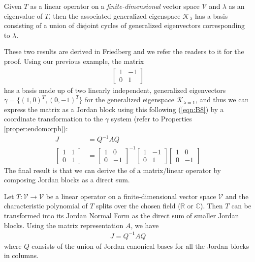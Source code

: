 \begin{thm}
\label{thm:B27}
Given $T$ as a linear operator on a \textit{finite-dimensional} vector space $\mathcal{V}$ and $\lambda$ as an eigenvalue of $T$, then the associated generalized eigenspace $\mathcal{K}_\lambda$ has a basis consisting of a union of disjoint cycles of generalized eigenvectors corresponding to $\lambda$.
\end{thm}
These two results are derived in Friedberg and we refer the readers to it for the proof. Using our previous example, the matrix
\begin{align*}
\begin{bmatrix}
1 & -1 \\
0 & 1
\end{bmatrix}    
\end{align*}
has a basis made up of two linearly independent, generalized eigenvectors $\gamma = \{(1,0)^T, (0,-1)^T\}$ for the generalized eigenspace $\mathcal{K}_{\lambda=1}$, and thus we can express the matrix as a Jordan block using this  following (\ref{eqn:B8}) by a coordinate transformation to the $\gamma$ system (refer to Properties \ref{proper:endomorph}):
\begin{align*}
J &= Q^{-1}AQ \\
\begin{bmatrix}
1 & 1 \\
0 & 1
\end{bmatrix} 
&=
\begin{bmatrix}
1 & 0 \\
0 & -1
\end{bmatrix}^{-1} 
\begin{bmatrix}
1 & -1 \\
0 & 1
\end{bmatrix} 
\begin{bmatrix}
1 & 0 \\
0 & -1
\end{bmatrix}
\end{align*}
The final result is that we can derive the  of a matrix/linear operator by composing Jordan blocks as a direct sum.
\begin{thm}
Let $T: \mathcal{V} \to \mathcal{V}$ be a linear operator on a finite-dimensional vector space $\mathcal{V}$ and the characteristic polynomial of $T$ splits over the chosen field ($\mathbb{R}$ or $\mathbb{C}$). Then $T$ can be transformed into its Jordan Normal Form as the direct sum of smaller Jordan blocks. Using the matrix representation $A$, we have
\begin{align}
J = Q^{-1}AQ
\end{align}
where $Q$ consists of the union of Jordan canonical bases for all the Jordan blocks in columns.
\end{thm}
